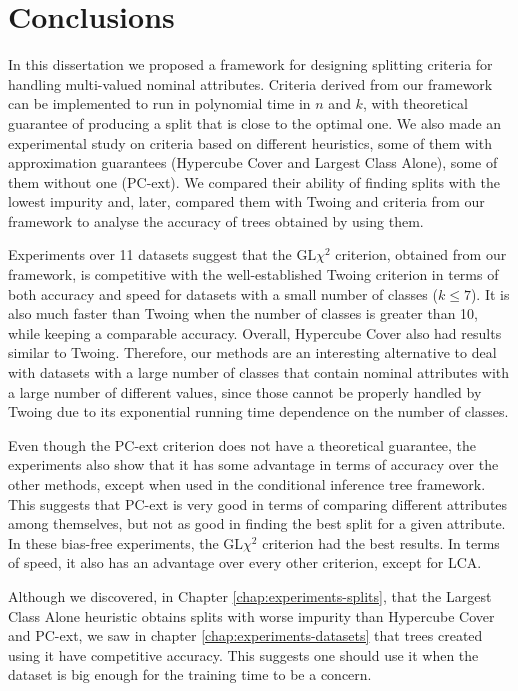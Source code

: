 \newpage

\chapter{Conclusions}
\label{chap:conclusions}

In this dissertation we proposed a framework for designing splitting criteria for handling multi-valued nominal attributes. Criteria derived from our framework can be implemented to run in polynomial time in $n$ and $k$, with theoretical guarantee of producing a split that is close to the optimal one. We also made an experimental study on criteria based on different heuristics, some of them with approximation guarantees (Hypercube Cover and Largest Class Alone), some of them without one (PC-ext). We compared their ability of finding splits with the lowest impurity and, later, compared them with Twoing and criteria from our framework to analyse the accuracy of trees obtained by using them.

Experiments over 11 datasets suggest that the GL$\chi^2$ criterion, obtained from our framework, is competitive with the well-established Twoing criterion in terms of both accuracy and speed for datasets with a small number of classes ($k \leq 7$). It is also much faster than Twoing when the number of classes is greater than 10, while keeping a comparable accuracy. Overall, Hypercube Cover also had results similar to Twoing. Therefore, our methods are an interesting alternative to deal with datasets with a large number of classes that contain nominal attributes with a large number of different values, since those cannot be properly handled by Twoing due to its exponential running time dependence on the number of classes.

Even though the PC-ext criterion does not have a theoretical guarantee, the experiments also show that it has some advantage in terms of accuracy over the other methods, except when used in the conditional inference tree framework. This suggests that PC-ext is very good in terms of comparing different attributes among themselves, but not as good in finding the best split for a given attribute. In these bias-free experiments, the GL$\chi^2$ criterion had the best results. In terms of speed, it also has an advantage over every other criterion, except for LCA.

Although we discovered, in Chapter \ref{chap:experiments-splits}, that the Largest Class Alone heuristic obtains splits with worse impurity than Hypercube Cover and PC-ext, we saw in chapter \ref{chap:experiments-datasets} that trees created using it have competitive accuracy. This suggests one should use it when the dataset is big enough for the training time to be a concern.

